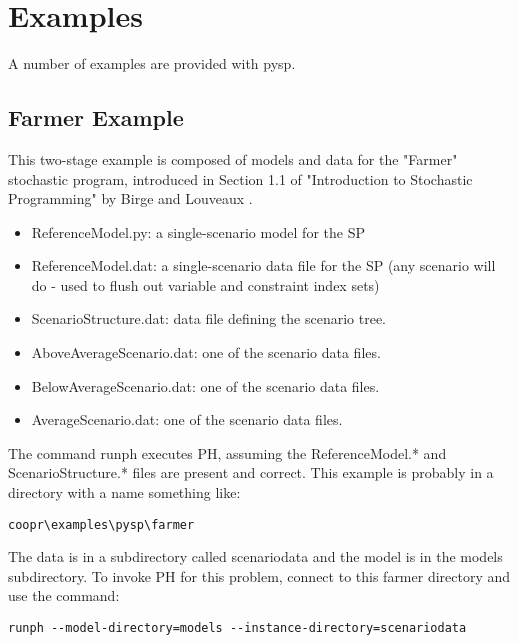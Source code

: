 \section{Examples \label{ExampleSec}}

A number of examples are provided with pysp.

\subsection{Farmer Example}

This two-stage example is composed of models and data for the "Farmer"
stochastic program, introduced in Section 1.1 of "Introduction to Stochastic
Programming" by Birge and Louveaux \cite{spbook}.

\begin{itemize}
  \item ReferenceModel.py: a single-scenario model for the SP

  \item ReferenceModel.dat: a single-scenario data file for the SP (any scenario
  will do - used to flush out variable and constraint index sets)

  \item ScenarioStructure.dat: data file defining the scenario tree.

  \item AboveAverageScenario.dat: one of the scenario data files.

  \item BelowAverageScenario.dat: one of the scenario data files.

  \item AverageScenario.dat: one of the scenario data files.
\end{itemize}

The command runph executes PH, assuming the ReferenceModel.* and
ScenarioStructure.* files are present and correct. This example is probably in a
directory with a name something like:

\begin{verbatim}
coopr\examples\pysp\farmer
\end{verbatim}

The data is in a subdirectory called scenariodata and the model is in the models
subdirectory. To invoke PH for this problem, connect to this farmer directory
and use the command:

\begin{verbatim}
runph --model-directory=models --instance-directory=scenariodata
\end{verbatim}

